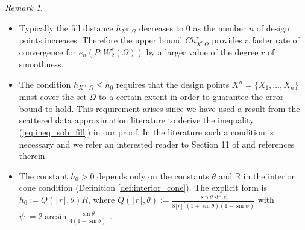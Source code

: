 \documentclass[11pt]{article}
\theoremstyle{remark}
\newtheorem{remark}{Remark}
\theoremstyle{example}
\theoremstyle{remark}
\newcommand{\R}{\mathbb{R}}
\newcommand{\citep}{\cite}
\begin{document}
\begin{remark} \rm
\begin{itemize}
\item 
Typically the fill distance $h_{X^n,\Omega}$ decreases to $0$ as the number $n$ of design points increases.
Therefore the upper bound $C h_{X^n \Omega}^r$ provides a faster rate of convergence for $e_n(P; W_2^r(\Omega))$ by a larger value of the degree $r$ of smoothness.\vspace{-1mm}
\item
The condition $h_{X^n,\Omega} \leq h_0$ requires that the design points $X^n = \{ X_1,\dots,X_n \}$ must cover the set $\Omega$ to a certain extent in order to guarantee the error bound to hold.
This requirement arises since we have used a result from the scattered data approximation literature \citep[Corollary 11.33]{Wen05} to derive the inequality (\ref{eq:ineq_sob_fill}) in our proof.
In the literature such a condition is necessary and we refer an interested reader to Section 11 of \cite{Wen05} and references therein.\vspace{-1mm}
\item
The constant $h_0 > 0$ depends only on the constants $\theta$ and $\R$ in the interior cone condition (Definition \ref{def:interior_cone}). %
The explicit form is $h_0 := Q(\lfloor r \rfloor, \theta) R$, where $Q(\lfloor r \rfloor,\theta) := \frac{ \sin \theta \sin \psi }{8 \lfloor r \rfloor^2 (1 + \sin \theta) (1 + \sin \psi) }$ with $\psi := 2 \arcsin \frac{\sin \theta}{4(1+\sin \theta)}$ \cite[p.199]{Wen05}.\vspace{-1mm}

\end{itemize}
\end{remark}
\end{document}
